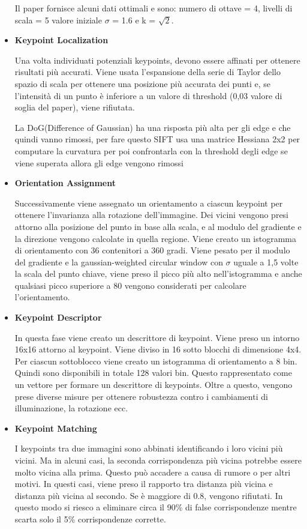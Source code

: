 \begin{itemize}
Il paper fornisce alcuni dati ottimali e sono: numero di ottave = 4, livelli di scala = 5 valore iniziale $\sigma$ = 1.6 e k = $\sqrt{2}$.

\item \textbf{Keypoint Localization}

Una volta individuati potenziali keypoints, devono essere affinati per ottenere risultati più accurati. Viene usata l'espansione della serie di Taylor dello spazio di scala per ottenere una posizione più accurata dei punti e, se l'intensità di un punto è inferiore a un valore di threshold (0,03 valore di soglia del paper), viene rifiutata.

La DoG(Difference of Gaussian) ha una risposta più alta per gli edge e che quindi vanno rimossi, per fare questo SIFT usa una matrice Hessiana 2x2 per computare la curvatura per poi confrontarla con la threshold degli edge se viene superata allora gli edge vengono rimossi
\item \textbf{Orientation Assignment}

Successivamente viene assegnato un orientamento a ciascun keypoint per ottenere l'invarianza alla rotazione dell'immagine. Dei vicini vengono presi attorno alla posizione del punto in base alla scala, e al modulo del gradiente e la direzione vengono calcolate in quella regione. Viene creato un istogramma di orientamento con 36 contenitori a 360 gradi. Viene pesato per il modulo del gradiente e la gaussian-weighted circular window con $\sigma$ uguale a 1,5 volte la scala del punto chiave, viene preso il picco più alto nell'istogramma e anche qualsiasi picco superiore a 80 vengono considerati per calcolare l'orientamento.
\item \textbf{Keypoint Descriptor}

In questa fase viene creato un descrittore di keypoint. Viene preso un intorno 16x16 attorno al keypoint. Viene  diviso in 16 sotto blocchi di dimensione 4x4. Per ciascun sottoblocco viene creato un istogramma di orientamento a 8 bin. Quindi sono disponibili in totale 128 valori bin. Questo rappresentato come un vettore per formare un descrittore di keypoints. Oltre a questo, vengono prese diverse misure per ottenere robustezza contro i cambiamenti di illuminazione, la rotazione ecc.


\item \textbf{Keypoint Matching}

I keypoints tra due immagini sono abbinati identificando i loro vicini più vicini. Ma in alcuni casi, la seconda corrispondenza più vicina potrebbe essere molto vicina alla prima. Questo può accadere a causa di rumore o per altri motivi. In questi casi, viene preso il rapporto tra distanza più vicina e distanza più vicina al secondo. Se è maggiore di 0.8, vengono rifiutati. In questo modo si riesco a eliminare circa il 90\% di false corrispondenze mentre scarta solo il 5\% corrispondenze corrette.
	


\end{itemize}

